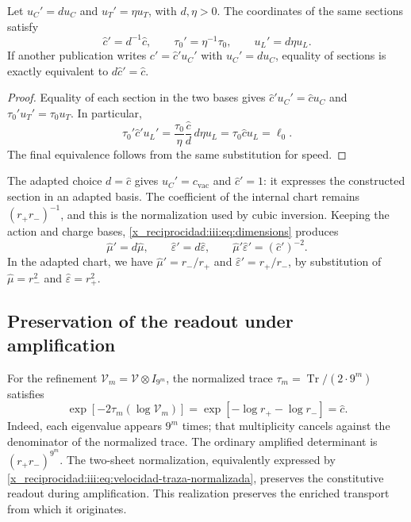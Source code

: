 \begin{proposition}
Let $u_C'=d u_C$ and $u_T'=\eta u_T$, with $d,\eta>0$.
The coordinates of the same sections satisfy
\begin{equation}
 \widehat c'=d^{-1}\widehat c,
 \qquad \tau_0'=\eta^{-1}\tau_0,
 \qquad u_L'=d\eta u_L.
 \label{x_reciprocidad:iii:eq:velocidad-cambio-carta}
\end{equation}
If another publication writes $c'=\widehat c' u_C'$ with $u_C'=d u_C$,
equality of sections is exactly equivalent to $d\widehat c'=\widehat c$.
\end{proposition}
\begin{proof}
Equality of each section in the two bases gives
$\widehat c'u_C'=\widehat c u_C$ and $\tau_0'u_T'=\tau_0u_T$.
In particular,
\[
 \tau_0'\widehat c'u_L'
 =\frac{\tau_0}{\eta}\frac{\widehat c}{d}\,d\eta u_L
 =\tau_0\widehat c u_L=\ell_0.
\]
The final equivalence follows from the same substitution for speed.
\end{proof}

The adapted choice $d=\widehat c$ gives $u_C'=c_{\mathrm{vac}}$ and
$\widehat c'=1$: it expresses the constructed section in an adapted basis.
The coefficient of the internal chart remains $(r_+r_-)^{-1}$, and this
is the normalization used by cubic inversion. Keeping the
action and charge bases, \eqref{x_reciprocidad:iii:eq:dimensions} produces
\[
 \widehat\mu'=d\widehat\mu,\qquad
 \widehat\varepsilon'=d\widehat\varepsilon,\qquad
 \widehat\mu'\widehat\varepsilon'=(\widehat c')^{-2}.
\]
In the adapted chart, we have $\widehat\mu'=r_-/r_+$ and
$\widehat\varepsilon'=r_+/r_-$, by substitution of
$\widehat\mu=r_-^2$ and $\widehat\varepsilon=r_+^2$.

\subsection{Preservation of the readout under amplification}

For the refinement $\mathcal V_m=\mathcal V\otimes I_{9^m}$, the
normalized trace $\tau_m=\operatorname{Tr}/(2\cdot9^m)$ satisfies
\begin{equation}
 \exp[-2\tau_m(\log\mathcal V_m)]
 =\exp[-\log r_+-\log r_-]=\widehat c.
 \label{x_reciprocidad:iii:eq:velocidad-traza-normalizada}
\end{equation}
Indeed, each eigenvalue appears $9^m$ times; that multiplicity
cancels against the denominator of the normalized trace. The ordinary
amplified determinant is $(r_+r_-)^{9^m}$. The two-sheet normalization,
equivalently expressed by \eqref{x_reciprocidad:iii:eq:velocidad-traza-normalizada},
preserves the constitutive readout during amplification. This
realization preserves the enriched transport from which it originates.


